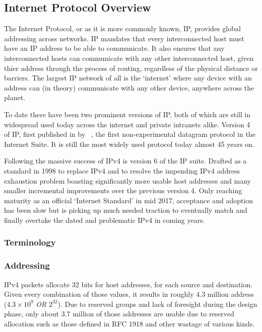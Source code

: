 
\subsection{Internet Protocol Overview}\label{sec:intro-ip}
The Internet Protocol, or as it is more commonly known, IP, provides global addressing across networks. IP mandates that every interconnected host must have an IP address to be able to communicate. It also ensures that any interconnected hosts can communicate with any other interconnected host, given thier address through the process of routing, regardless of the physical distance or barriers. The largest IP network of all is the `internet' where any device with an address can (in theory) communicate with any other device, anywhere across the planet.

To date there have been two prominent versions of IP, both of which are still in widespread used today across the internet and private intranets alike. Version 4 of IP, first published in \citeyear{cerf1974protocol} by \citeauthor{cerf1974protocol}~\cite{cerf1974protocol}, the first non-experimental datagram protocol in the Internet Suite. It is still the most widely used protocol today almost 45 years on.

Following the massive success of IPv4 is version 6 of the IP suite. Drafted as a standard in 1998 to replace IPv4 and to resolve the impending IPv4 address exhaustion problem boasting significantly more usable host addresses and many smaller incremental improvements over the previous version 4. Only reaching maturity as an official `Internet Standard' in mid 2017, acceptance and adoption has been slow but is picking up much needed traction to eventually match and finally overtake the dated and problematic IPv4 in coming years.

    \subsubsection{Terminology}

    \subsubsection{Addressing}
    IPv4 packets allocate 32 bits for host addresses, for each source and destination. Given every combination of those values, it results in roughly 4.3 million address ($4.3 \times 10^{9}$ \textit{OR} $2^{32}$). Due to reserved groups and lack of foresight during the design phase, only about 3.7 million of those addresses are usable due to reserved allocation such as those defined in RFC 1918 and other wastage of various kinds.

